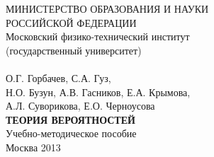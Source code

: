 \begin{center}

МИНИСТЕРСТВО ОБРАЗОВАНИЯ И НАУКИ \\
РОССИЙСКОЙ ФЕДЕРАЦИИ \\

 $ $ \\

Московский физико-технический институт \\
(государственный университет) \\
 
  $ $ \\ $ $ \\ $ $ \\
  $ $ \\
{\fboxsep=1pt } \\
$ $\\
О.Г. Горбачев, С.А. Гуз, \\
Н.О. Бузун, А.В. Гасников, Е.А. Крымова, \\
А.Л. Суворикова, Е.О. Черноусова \\
 
 $ $ \\ $ $ \\
 
\textbf{ТЕОРИЯ ВЕРОЯТНОСТЕЙ} \\
 
 $ $ \\
  $ $ \\
  $ $ \\
Учебно-методическое пособие \\
 
  $ $ \\ $ $ \\ $ $ \\ $ $ \\
 $ $ \\ $ $ \\ $ $ \\ $ $ \\ $ $ \\ $ $ \\
 
Москва 2013


\end{center}

\newpage